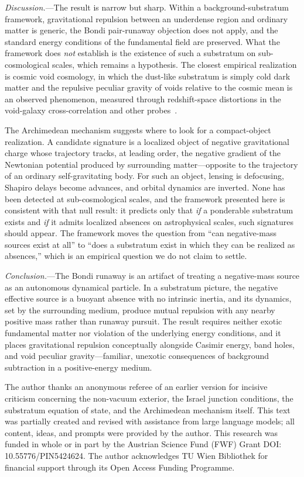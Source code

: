 \documentclass[%
  reprint,
  superscriptaddress,
  amsmath,amssymb,
  prl,
  floatfix,
  x11names
]{revtex4-2}
\begin{document}
\textit{Discussion.}---The result is narrow but sharp. Within a background-substratum framework, gravitational repulsion between an underdense region and ordinary matter is generic, the Bondi pair-runaway objection does not apply, and the standard energy conditions of the fundamental field are preserved. What the framework does \emph{not} establish is the existence of such a substratum on sub-cosmological scales, which remains a hypothesis. The closest empirical realization is cosmic void cosmology, in which the dust-like substratum is simply cold dark matter and the repulsive peculiar gravity of voids relative to the cosmic mean is an observed phenomenon, measured through redshift-space distortions in the void-galaxy cross-correlation and other probes~\cite{hamaus-2014,nadathur-2019}.

The Archimedean mechanism suggests where to look for a compact-object realization. A candidate signature is a localized object of negative gravitational charge whose trajectory tracks, at leading order, the negative gradient of the Newtonian potential produced by surrounding matter---opposite to the trajectory of an ordinary self-gravitating body. For such an object, lensing is defocusing, Shapiro delays become advances, and orbital dynamics are inverted. None has been detected at sub-cosmological scales, and the framework presented here is consistent with that null result: it predicts only that \emph{if} a ponderable substratum exists and \emph{if} it admits localized absences on astrophysical scales, such signatures should appear. The framework moves the question from ``can negative-mass sources exist at all'' to ``does a substratum exist in which they can be realized as absences,'' which is an empirical question we do not claim to settle.

\textit{Conclusion.}---The Bondi runaway is an artifact of treating a negative-mass source as an autonomous dynamical particle. In a substratum picture, the negative effective source is a buoyant absence with no intrinsic inertia, and its dynamics, set by the surrounding medium, produce mutual repulsion with any nearby positive mass rather than runaway pursuit. The result requires neither exotic fundamental matter nor violation of the underlying energy conditions, and it places gravitational repulsion conceptually alongside Casimir energy, band holes, and void peculiar gravity---familiar, unexotic consequences of background subtraction in a positive-energy medium.

\begin{acknowledgments}
The author thanks an anonymous referee of an earlier version for incisive criticism concerning the non-vacuum exterior, the Israel junction conditions, the substratum equation of state, and the Archimedean mechanism itself. This text was partially created and revised with assistance from large language models; all content, ideas, and prompts were provided by the author. This research was funded in whole or in part by the Austrian Science Fund (FWF) Grant DOI: 10.55776/PIN5424624. The author acknowledges TU Wien Bibliothek for financial support through its Open Access Funding Programme.
\end{acknowledgments}


\end{document}
